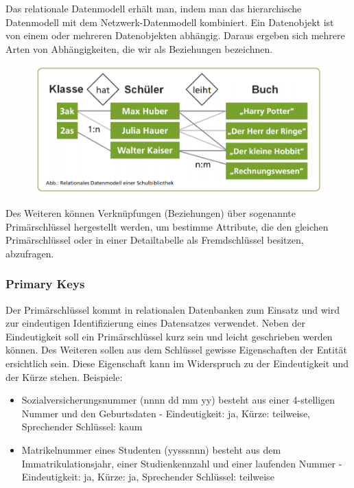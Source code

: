 Das relationale Datenmodell erhält man, indem man das hierarchische Datenmodell mit dem Netzwerk-Datenmodell kombiniert. Ein Datenobjekt ist von einem oder mehreren Datenobjekten abhängig. Daraus ergeben sich mehrere Arten von Abhängigkeiten, die wir als Beziehungen bezeichnen.

\begin{figure}[h]
    \centering
    \includegraphics[width=.8\textwidth]{Content/images/modellierung/biblio.png}
    \caption{}
    \label{fig:modellierung:biblio}
\end{figure}

Des Weiteren können Verknüpfungen (Beziehungen) über sogenannte Primärschlüssel hergestellt werden, um bestimme Attribute, die den gleichen Primärschlüssel oder in einer Detailtabelle als Fremdschlüssel besitzen, abzufragen.

\subsubsection{Primary Keys}

Der Primärschlüssel kommt in relationalen Datenbanken zum Einsatz und wird zur eindeutigen Identifizierung eines Datensatzes verwendet. Neben der Eindeutigkeit soll ein Primärschlüssel kurz sein und leicht geschrieben werden können. Des Weiteren sollen aus dem Schlüssel gewisse Eigenschaften der Entität ersichtlich sein. Diese Eigenschaft kann im Widerspruch zu der Eindeutigkeit und der Kürze stehen. 
Beispiele:
\begin{itemize}
    \item Sozialversicherungsnummer (nnnn dd mm yy) besteht aus einer 4-stelligen Nummer und den Geburtsdaten - Eindeutigkeit: ja, Kürze: teilweise, Sprechender Schlüssel: kaum
    \item Matrikelnummer eines Studenten (yysssnnn) besteht aus dem Immatrikulationsjahr, einer Studienkennzahl und einer laufenden Nummer - Eindeutigkeit: ja, Kürze: ja, Sprechender Schlüssel: teilweise
\end{itemize}

